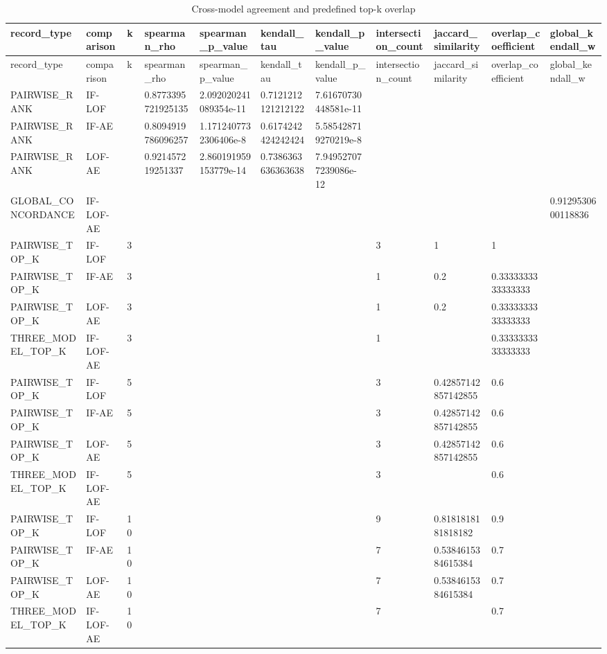 \begin{longtable}{lllllllllll}
\caption{Cross-model agreement and predefined top-k overlap}\\
\toprule
record\_type & comparison & k & spearman\_rho & spearman\_p\_value & kendall\_tau & kendall\_p\_value & intersection\_count & jaccard\_similarity & overlap\_coefficient & global\_kendall\_w \\
\midrule
\endfirsthead
\toprule
record\_type & comparison & k & spearman\_rho & spearman\_p\_value & kendall\_tau & kendall\_p\_value & intersection\_count & jaccard\_similarity & overlap\_coefficient & global\_kendall\_w \\
\midrule
\endhead
PAIRWISE\_RANK & IF-LOF &  & 0.8773395721925135 & 2.092020241089354e-11 & 0.7121212121212122 & 7.61670730448581e-11 &  &  &  &  \\
PAIRWISE\_RANK & IF-AE &  & 0.8094919786096257 & 1.1712407732306406e-8 & 0.6174242424242424 & 5.585428719270219e-8 &  &  &  &  \\
PAIRWISE\_RANK & LOF-AE &  & 0.921457219251337 & 2.860191959153779e-14 & 0.7386363636363638 & 7.949527077239086e-12 &  &  &  &  \\
GLOBAL\_CONCORDANCE & IF-LOF-AE &  &  &  &  &  &  &  &  & 0.9129530600118836 \\
PAIRWISE\_TOP\_K & IF-LOF & 3 &  &  &  &  & 3 & 1 & 1 &  \\
PAIRWISE\_TOP\_K & IF-AE & 3 &  &  &  &  & 1 & 0.2 & 0.3333333333333333 &  \\
PAIRWISE\_TOP\_K & LOF-AE & 3 &  &  &  &  & 1 & 0.2 & 0.3333333333333333 &  \\
THREE\_MODEL\_TOP\_K & IF-LOF-AE & 3 &  &  &  &  & 1 &  & 0.3333333333333333 &  \\
PAIRWISE\_TOP\_K & IF-LOF & 5 &  &  &  &  & 3 & 0.42857142857142855 & 0.6 &  \\
PAIRWISE\_TOP\_K & IF-AE & 5 &  &  &  &  & 3 & 0.42857142857142855 & 0.6 &  \\
PAIRWISE\_TOP\_K & LOF-AE & 5 &  &  &  &  & 3 & 0.42857142857142855 & 0.6 &  \\
THREE\_MODEL\_TOP\_K & IF-LOF-AE & 5 &  &  &  &  & 3 &  & 0.6 &  \\
PAIRWISE\_TOP\_K & IF-LOF & 10 &  &  &  &  & 9 & 0.8181818181818182 & 0.9 &  \\
PAIRWISE\_TOP\_K & IF-AE & 10 &  &  &  &  & 7 & 0.5384615384615384 & 0.7 &  \\
PAIRWISE\_TOP\_K & LOF-AE & 10 &  &  &  &  & 7 & 0.5384615384615384 & 0.7 &  \\
THREE\_MODEL\_TOP\_K & IF-LOF-AE & 10 &  &  &  &  & 7 &  & 0.7 &  \\
\bottomrule
\end{longtable}
